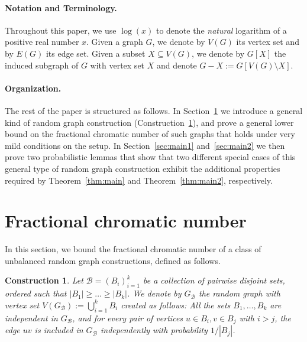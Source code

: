 \documentclass[a4paper,10pt]{amsart}
\newtheorem{construction}[theorem]{Construction}
\begin{document}
\medskip

\paragraph*{\textbf{Notation and Terminology.}} Throughout this paper, we use $\log(x)$ to denote the \emph{natural} logarithm of a positive real number $x$. Given a graph $G$, we denote by $V(G)$ its vertex set and by $E(G)$ its edge set. Given a subset $X\subseteq V(G)$, we denote by $G[X]$ the induced subgraph of $G$ with vertex set $X$ and denote $G-X:=G[V(G)\setminus X]$.

\medskip

\paragraph*{\textbf{Organization.}} The rest of the paper is structured as follows. In Section~\ref{sec:frac} we introduce a general kind of random graph construction (Construction~\ref{con:randomgraph}), and prove a general lower bound on the fractional chromatic number of such graphs that holds under very mild conditions on the setup. In Section~\ref{sec:main1} and~\ref{sec:main2} we then prove two probabilistic lemmas that show that two different special cases of this general type of random graph construction exhibit the additional properties required by Theorem~\ref{thm:main} and Theorem~\ref{thm:main2}, respectively.

\section{Fractional chromatic number}\label{sec:frac}

In this section, we bound the fractional chromatic number of a class of unbalanced random graph constructions, defined as follows.

\begin{construction}\label{con:randomgraph}
    Let $\mathcal{B}=(B_i)_{i=1}^{k}$ be a collection of pairwise disjoint sets, ordered such that   $|B_1|\ge \dots\ge |B_k|$. We denote by $G_{\mathcal{B}}$ the random graph with vertex set $V(G_{\mathcal{B}}):=\bigcup_{i=1}^{k}{B_i}$ created as follows: All the sets $B_1,\ldots,B_k$ are independent in $G_{\mathcal{B}}$, and for every pair of vertices $u\in B_i, v\in B_j$ with $i>j$, the edge $uv$ is included in $G_{\mathcal{B}}$ independently with probability $1/|B_j|$.
\end{construction}
\end{document}
